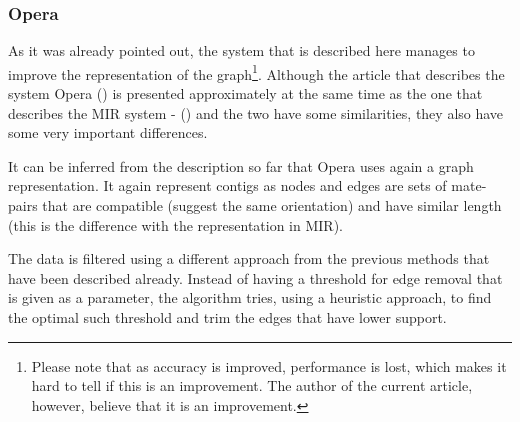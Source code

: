 \documentclass[11pt]{article}
\begin{document}



\subsubsection{Opera} %
\label{ssub:Opera}
As it was already pointed out, the system that is described here manages to
improve the representation of the graph\footnote{Please note that as accuracy is
improved, performance is lost, which makes it hard to tell if this is an
improvement. The author of the current article, however, believe that it is an
improvement.}. Although the article that describes the system Opera 
(\cite{Opera}) is presented approximately at the same time as the one that
describes the MIR system - (\cite{MIR}) and the two have some similarities, they
also have some very important differences. 

It can be inferred from the description so far that Opera uses again a graph
representation. It again represent contigs as nodes and edges are sets of
mate-pairs that are compatible (suggest the same orientation) and have similar
length (this is the difference with the representation in MIR).

The data is filtered using a different approach from the previous methods that
have been described already. Instead of having a threshold for edge removal
that is given as a parameter, the algorithm tries, using a heuristic approach,
to find the optimal such threshold and trim the edges that have lower support.
\end{document}
